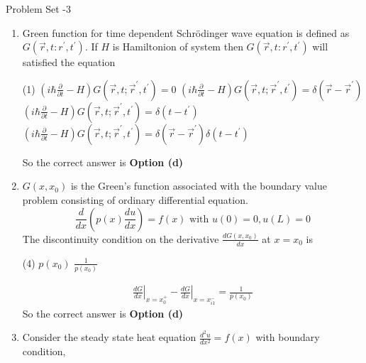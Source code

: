 \begin{abox}
	Problem Set -3
\end{abox}
\begin{enumerate}[label=\color{ocre}\textbf{\arabic*.}]
	\item Green function for time dependent Schrödinger wave equation is defined as $G\left(\vec{r}, t: r^{\prime}, t^{\prime}\right)$. If $H$ is Hamiltonion of system then $G\left(\vec{r}, t: r^{\prime}, t^{\prime}\right)$ will satisfied the equation
	 \begin{tasks}(1)
		\task[\textbf{a.}]$\left(i \hbar \frac{\partial}{\partial t}-H\right) G\left(\vec{r}, t ; \vec{r}^{\prime}, t^{\prime}\right)=0$
		\task[\textbf{b.}]$\left(i \hbar \frac{\partial}{\partial t}-H\right) G\left(\vec{r}, t ; \vec{r}^{\prime}, t^{\prime}\right)=\delta\left(\vec{r}-\vec{r}^{\prime}\right)$
		\task[\textbf{c.}] $\left(i \hbar \frac{\partial}{\partial t}-H\right) G\left(\vec{r}, t ; \vec{r}^{\prime}, t^{\prime}\right)=\delta\left(t-t^{\prime}\right)$
		\task[\textbf{d.}]  $\left(i \hbar \frac{\partial}{\partial t}-H\right) G\left(\vec{r}, t ; \vec{r}^{\prime}, t^{\prime}\right)=\delta\left(\vec{r}-\vec{r}^{\prime}\right) \delta\left(t-t^{\prime}\right)$
	\end{tasks}
\begin{answer}
So the correct answer is \textbf{Option (d)}
\end{answer}
	\item $G\left(x, x_{0}\right)$ is the Green's function associated with the boundary value problem consisting of ordinary differential equation.
	$$
	\frac{d}{d x}\left(p(x) \frac{d u}{d x}\right)=f(x) \text { with } u(0)=0, u(L)=0
	$$
	The discontinuity condition on the derivative $\frac{d G\left(x, x_{0}\right)}{d x}$ at $x=x_{0}$ is
	 \begin{tasks}(4)
		\task[\textbf{b.}]$p\left(x_{0}\right)$
		\task[\textbf{d.}] $\frac{1}{p\left(x_{0}\right)}$
	\end{tasks}
\begin{answer}
	\begin{align*}
	\left.\frac{d G}{d x}\right|_{x=x_{0}^{+}}-\left.\frac{d G}{d x}\right|_{x=x_{i 1}^{-}}=\frac{1}{p\left(x_{0}\right)}
	\end{align*}
	So the correct answer is \textbf{Option (d)}
\end{answer}
\item Consider the steady state heat equation $\frac{d^{2} u}{d x^{2}}=f(x)$ with boundary condition,
$$
$$
\end{enumerate}
